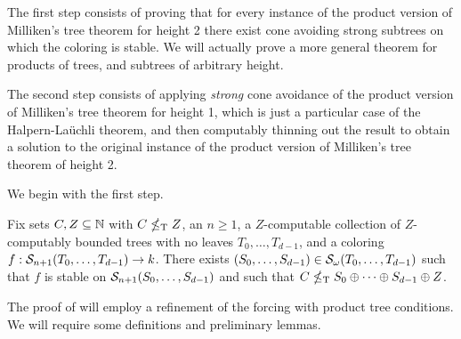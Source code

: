 The first step consists of proving that for every instance of the product version of Milliken's tree theorem for height 2 there exist cone avoiding strong subtrees on which the coloring is stable. We will actually prove a more general theorem for products of trees, and subtrees of arbitrary height.%

The second step consists of applying \emph{strong} cone avoidance of the product version of Milliken's tree theorem for height 1, which is just a particular case of the Halpern-La\"{u}chli theorem, and then computably thinning out the result to obtain a solution to the original instance of the product version of Milliken's tree theorem of height 2.


We begin with the first step.

\begin{theorem}\label{thm:cmtt-admits-strong-cone-avoidance}
Fix sets $C,Z \subseteq \mathbb{N}$ with $C \nleq_{\text{\upshape T}} Z$, an $n \geq 1$, a 
$Z$-computable collection of $Z$-computably bounded trees with no leaves $T_0, \dots, T_{d-1}$, and a coloring $f: \mathcal{S}_{n+1}({T_0, \dots, T_{d-1}}) \to k$. 
There exists $(S_0, \dots,\allowbreak S_{d-1}) \in\mathcal{S}_{\omega}({T_0, \dots, T_{d-1}})$ such that $f$ is stable on $\mathcal{S}_{n+1}({S_0, \dots, S_{d-1}})$ and such that $C \nleq_{\text{\upshape T}} S_0 \oplus \dots \oplus S_{d-1} \oplus Z$.
\end{theorem}

The proof of  will employ a refinement of the forcing with product tree conditions. We will require some definitions and preliminary lemmas.


